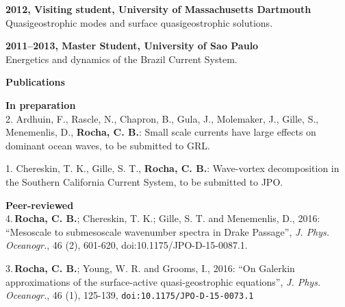 \documentclass[a4paper,11pt,final]{memoir}
\newcommand{\Sep}{\vspace{1.25em}}
\newcommand{\SmallSep}{\vspace{0.5em}}
\newcommand{\CVSection}[1]
    {\Large\textbf{#1}\par
    \SmallSep\normalsize\normalfont}
\newcommand{\CVItem}[1]
    {\textbf{\color{NavyBlue} #1}}
\begin{document}
\CVItem{2012, Visiting student, University of Massachusetts Dartmouth}\\
Quasigeostrophic modes and surface quasigeostrophic solutions.
\SmallSep

\CVItem{2011--2013, Master Student, University of Sao Paulo}\\
Energetics and dynamics of the Brazil Current System.


\Sep

\CVSection{Publications}

\CVItem{In preparation}\\






2. Ardhuin, F., Rascle, N., Chapron, B., Gula, J., Molemaker, J., Gille, S., Menemenlis, D., \textbf{Rocha, C. B.}: Small scale currents have large effects on dominant ocean waves, to be submitted to GRL.

\SmallSep

1. Chereskin, T. K., Gille, S. T., \textbf{Rocha, C. B.}: Wave-vortex decomposition in the Southern California Current System, to be submitted to JPO. 

\SmallSep

\CVItem{Peer-reviewed}\\

4.\,\textbf{Rocha, C. B.};  Chereskin, T. K.; Gille, S. T. and Menemenlis, D., 2016: ``Mesoscale to submesoscale wavenumber spectra in Drake Passage'', \textit{J. Phys. Oceanogr.}, 46 (2), 601-620, doi:10.1175/JPO-D-15-0087.1. 

\SmallSep

3.\,\textbf{Rocha, C. B.};  Young, W. R. and Grooms, I., 2016: ``On Galerkin approximations of the surface-active quasi-geostrophic equations'', \textit{J. Phys. Oceanogr.}, 46 (1), 125-139, \texttt{doi:10.1175/JPO-D-15-0073.1} 
\end{document}
